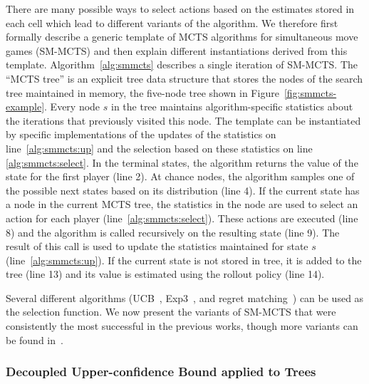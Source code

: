 There are many possible ways to select actions based on the estimates stored in each cell which lead to different variants of the algorithm.
We therefore first formally describe a generic template of MCTS algorithms for simultaneous move games (SM-MCTS) and then explain different instantiations derived from this template.
Algorithm~\ref{alg:smmcts} describes a single iteration of SM-MCTS.
The ``MCTS tree'' is an explicit tree data structure that stores the nodes of the search tree maintained in memory,
\eg the five-node tree shown in Figure~\ref{fig:smmcts-example}.
Every node $s$ in the tree maintains algorithm-specific statistics about the iterations that previously visited this node.
The template can be instantiated by specific implementations of the updates of the statistics on line~\ref{alg:smmcts:up} and the selection based on these statistics on line \ref{alg:smmcts:select}.
In the terminal states, the algorithm returns the value of the state for the first player (line 2).
At chance nodes, the algorithm samples one of the possible next states based on its distribution (line 4).
If the current state has a node in the current MCTS tree, the statistics in the node are used to select an action for each player (line~\ref{alg:smmcts:select}).
These actions are executed (line 8) and the algorithm is called recursively on the resulting state (line 9).
The result of this call is used to update the statistics maintained for state $s$ (line~\ref{alg:smmcts:up}).
If the current state is not stored in tree, it is added to the tree (line 13) and its value is estimated using the rollout policy (line 14).

Several different algorithms (\eg UCB~\cite{UCB}, Exp3~\cite{Auer2003Exp3}, and regret matching~\cite{Hart00}) can be used as the selection function.
We now present the variants of SM-MCTS that were consistently the most successful in the previous works,
though more variants can be found in~\cite{Perick12Comparison,Lanctot13Tron,Tak14smmcts}.

\subsubsection{Decoupled Upper-confidence Bound applied to Trees}\label{sec:duct}

